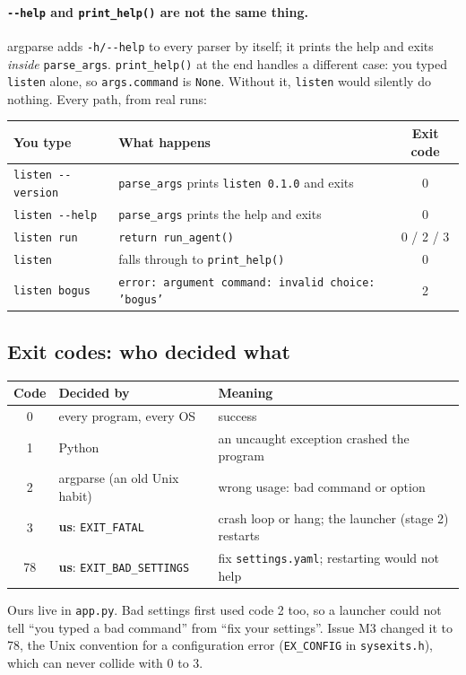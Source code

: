 \documentclass[11pt,a4paper]{article}
\begin{document}
\paragraph{\texttt{-{}-help} and \texttt{print\_help()} are not the same thing.} argparse adds
\texttt{-h/-{}-help} to every parser by itself; it prints the help and exits \emph{inside}
\texttt{parse\_args}. \texttt{print\_help()} at the end handles a different case: you typed
\texttt{listen} alone, so \texttt{args.command} is \texttt{None}. Without it, \texttt{listen}
would silently do nothing. Every path, from real runs:
\begin{center}
\begin{tabularx}{\textwidth}{l X c}
\toprule
\textbf{You type} & \textbf{What happens} & \textbf{Exit code} \\
\midrule
\texttt{listen -{}-version} & \texttt{parse\_args} prints \texttt{listen 0.1.0} and exits & 0 \\
\texttt{listen -{}-help} & \texttt{parse\_args} prints the help and exits & 0 \\
\texttt{listen run} & \texttt{return run\_agent()} & 0 / 2 / 3 \\
\texttt{listen} & falls through to \texttt{print\_help()} & 0 \\
\texttt{listen bogus} & \texttt{error: argument command: invalid choice: 'bogus'} & 2 \\
\bottomrule
\end{tabularx}
\end{center}

\subsection{Exit codes: who decided what}
\begin{center}
\begin{tabularx}{\textwidth}{c l X}
\toprule
\textbf{Code} & \textbf{Decided by} & \textbf{Meaning} \\
\midrule
0 & every program, every OS & success \\
1 & Python & an uncaught exception crashed the program \\
2 & argparse (an old Unix habit) & wrong usage: bad command or option \\
3 & \textbf{us}: \texttt{EXIT\_FATAL} & crash loop or hang; the launcher (stage 2) restarts \\
78 & \textbf{us}: \texttt{EXIT\_BAD\_SETTINGS} & fix \texttt{settings.yaml}; restarting would not help \\
\bottomrule
\end{tabularx}
\end{center}
\noindent Ours live in \texttt{app.py}. Bad settings first used code 2 too, so a launcher could not
tell ``you typed a bad command'' from ``fix your settings''. Issue M3 changed it to 78, the Unix
convention for a configuration error (\texttt{EX\_CONFIG} in \texttt{sysexits.h}), which can never
collide with 0 to 3.
\end{document}
